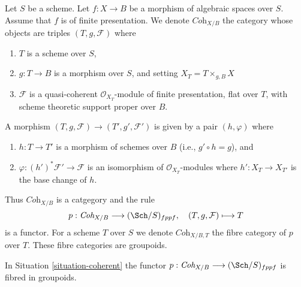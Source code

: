 \begin{situation}
\label{situation-coherent}
Let $S$ be a scheme. Let $f : X \to B$ be a morphism of algebraic spaces
over $S$. Assume that $f$ is of finite presentation.
We denote $\textit{Coh}_{X/B}$ the category whose objects are
triples $(T, g, \mathcal{F})$ where
\begin{enumerate}
\item $T$ is a scheme over $S$,
\item $g : T \to B$ is a morphism over $S$, and setting
$X_T = T \times_{g, B} X$
\item $\mathcal{F}$ is a quasi-coherent $\mathcal{O}_{X_T}$-module
of finite presentation, flat over $T$, with scheme theoretic support
proper over $B$.
\end{enumerate}
A morphism $(T, g, \mathcal{F}) \to (T', g', \mathcal{F}')$
is given by a pair $(h, \varphi)$ where
\begin{enumerate}
\item $h : T \to T'$ is a morphism of schemes over $B$
(i.e., $g' \circ h = g$), and
\item $\varphi : (h')^*\mathcal{F}' \to \mathcal{F}$ is an
isomorphism of $\mathcal{O}_{X_T}$-modules where $h' : X_T \to X_{T'}$
is the base change of $h$.
\end{enumerate}
\end{situation}

\noindent
Thus $\textit{Coh}_{X/B}$ is a catgegory and the rule
$$
p : \textit{Coh}_{X/B} \longrightarrow (\Sch/S)_{fppf},
\quad
(T, g, \mathcal{F}) \longmapsto T
$$
is a functor. For a scheme $T$ over $S$ we denote $\textit{Coh}_{X/B, T}$
the fibre category of $p$ over $T$. These fibre categories are groupoids.

\begin{lemma}
\label{lemma-coherent-fibred-in-groupoids}
In Situation \ref{situation-coherent} the functor
$p : \textit{Coh}_{X/B} \longrightarrow (\Sch/S)_{fppf}$
is fibred in groupoids.
\end{lemma}

